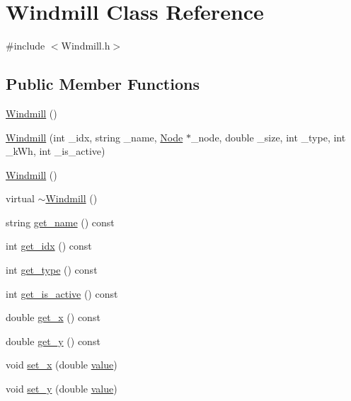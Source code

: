 \hypertarget{class_windmill}{}\section{Windmill Class Reference}
\label{class_windmill}


{\ttfamily \#include $<$Windmill.\+h$>$}

\subsection*{Public Member Functions}
\begin{DoxyCompactItemize}
\item 
\mbox{\hyperlink{class_windmill_a1c1c3d64318b42e398b44a184b20aacd}{Windmill}} ()
\item 
\mbox{\hyperlink{class_windmill_a4b1638f4202bc635071f6f0034cdc2f0}{Windmill}} (int \+\_\+idx, string \+\_\+name, \mbox{\hyperlink{class_node}{Node}} $\ast$\+\_\+node, double \+\_\+size, int \+\_\+type, int \+\_\+k\+Wh, int \+\_\+is\+\_\+active)
\item 
\mbox{\hyperlink{class_windmill_a1c1c3d64318b42e398b44a184b20aacd}{Windmill}} ()
\item 
virtual \mbox{\hyperlink{class_windmill_a2a34ccc52cd7bca9db02494eb0c14876}{$\sim$\+Windmill}} ()
\item 
string \mbox{\hyperlink{class_windmill_af92ebf7972106f12cdbc856ef98a829c}{get\+\_\+name}} () const
\item 
int \mbox{\hyperlink{class_windmill_a609521495ddc227888b3cab504ea9fba}{get\+\_\+idx}} () const
\item 
int \mbox{\hyperlink{class_windmill_a50457283d873a95457c1cc1b0fd1a33b}{get\+\_\+type}} () const
\item 
int \mbox{\hyperlink{class_windmill_a31c7e5766ef3621c9fbfa949104278b9}{get\+\_\+is\+\_\+active}} () const
\item 
double \mbox{\hyperlink{class_windmill_aa26470b5a5f65c3fd83dfbc1455b8f22}{get\+\_\+x}} () const
\item 
double \mbox{\hyperlink{class_windmill_a530a5389da11b72da1a5f519ff62d4e5}{get\+\_\+y}} () const
\item 
void \mbox{\hyperlink{class_windmill_aa30d16b7d9666e00dad2a13b6d8bda58}{set\+\_\+x}} (double \mbox{\hyperlink{diffusion_8cpp_a4b41795815d9f3d03abfc739e666d5da}{value}})
\item 
void \mbox{\hyperlink{class_windmill_ab669b5a24920634578d95c6d4b967cf9}{set\+\_\+y}} (double \mbox{\hyperlink{diffusion_8cpp_a4b41795815d9f3d03abfc739e666d5da}{value}})

\end{DoxyCompactItemize}

